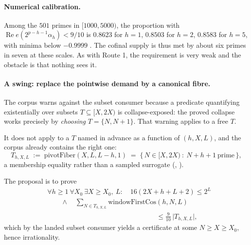 \paragraph{Numerical calibration.} Among the $501$ primes in $[1000,5000)$,
the proportion with $\operatorname{Re}e(2^{p-h-1}\alpha_h)<9/10$ is $0.8623$
for $h=1$, $0.8503$ for $h=2$, $0.8583$ for $h=5$, with minima below
$-0.9999$ . The cofinal supply is thus met by about six primes in
seven at these scales. As with Route 1, the requirement is very weak and the
obstacle is that nothing sees it.

\paragraph{A swing: replace the pointwise demand by a canonical fibre.}
The corpus warns against the subset consumer
because a predicate quantifying existentially over subsets
$T\subseteq[X,2X)$ is collapse-exposed: the proved collapse
works precisely by \emph{choosing} $T=\{N,N+1\}$. That warning applies to a
free $T$.

It does not apply to a $T$ named in advance as a function of
$(h,X,L)$, and the corpus already contains the right one:
\[
  T_{h,X,L}\;:=\;\mathrm{pivotFiber}(X,L,L-h,1)
  \;=\;\{\,N\in[X,2X)\ :\ N+h+1\ \text{prime}\,\},
\]
a membership equality rather than a sampled surrogate
(,
).

The proposal is to prove
\begin{equation}\label{eq:primefibre}
\begin{aligned}
&\forall h\ge1\ \forall X_0\ \exists X\ge X_0,\ L:\quad
  16(2X+h+L+2)\le 2^{L} \\
&\qquad\wedge\quad
  \sum_{N\in T_{h,X,L}}\mathrm{windowFirstCos}(h,N,L) \\
&\hspace{16em}\le \tfrac{9}{10}\,\bigl|T_{h,X,L}\bigr|,
\end{aligned}
\end{equation}
which by the landed subset consumer yields a certificate at some
$N\ge X\ge X_0$, hence irrationality. 

